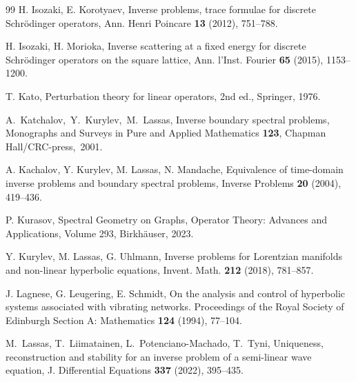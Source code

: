 \documentclass[11pt]{amsart}
\theoremstyle{definition}
\theoremstyle{plain}
\numberwithin{equation}{section}
\begin{document}
\begin{thebibliography}{99}
H. Isozaki, E. Korotyaev, Inverse problems, trace formulae for discrete Schr{\"o}dinger operators, Ann. Henri Poincare {\bf 13} (2012), 751--788.

H. Isozaki, H. Morioka, Inverse scattering at a fixed energy for discrete Schr{\"o}dinger operators on the square lattice, Ann. l’Inst. Fourier {\bf 65} (2015), 1153--1200.

 

T. Kato, Perturbation theory for linear operators, 2nd ed., Springer, 1976.


  



  


 A.~Katchalov,~Y.~Kurylev,~M.~Lassas, {Inverse boundary spectral problems}, Monographs and Surveys in Pure and Applied Mathematics \textbf{123}, Chapman Hall/CRC-press,~2001.

 A. Kachalov, Y. Kurylev, M. Lassas, N. Mandache, Equivalence of time-domain inverse
problems and boundary spectral problems, Inverse Problems {\bf 20} (2004), 419--436.

 P. Kurasov,  {Spectral Geometry on Graphs}, Operator Theory: Advances and Applications, Volume 293, Birkh\"auser, 2023.


Y. Kurylev, M. Lassas, G. Uhlmann, {Inverse problems for Lorentzian manifolds and non-linear hyperbolic equations}, Invent. Math. \textbf{212} (2018), 781--857.


J. Lagnese, G. Leugering, E. Schmidt, On the analysis and control of hyperbolic systems associated with vibrating networks.
\newblock Proceedings of the Royal Society of Edinburgh Section A: Mathematics \textbf{124} (1994), 77--104.

M.~Lassas, T.~Liimatainen, L.~Potenciano-Machado, T.~Tyni, {Uniqueness, reconstruction and stability for an inverse problem of a semi-linear wave equation}, J. Differential Equations \textbf{337} (2022), 395--435. 




\end{thebibliography}
\end{document}
